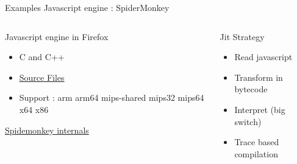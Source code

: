 %
\begin{Frame}{Examples Javascript engine : SpiderMonkey}
  \begin{columns}[t]
    \begin{column}{\BW} %
      \begin{block}{Javascript engine in Firefox}
        \begin{itemize}
        \item C and C++
        \item
          \href{https://hg.mozilla.org/mozilla-central/file/tip/js/src}{Source
            Files}
        \item Support : arm arm64 mips-shared mips32 mips64 x64 x86
        \end{itemize}
      \end{block} 
      \href{https://developer.mozilla.org/en-US/docs/Mozilla/Projects/SpiderMonkey/Internals}{Spidemonkey  internals}
    \end{column}
    
    \begin{column}{\BW} %
      \begin{block}{Jit Strategy}
        \begin{itemize}
        \item Read javascript
        \item Transform in bytecode
        \item Interpret (big switch)
        \item Trace based compilation
        \end{itemize}
      \end{block}   
    \end{column}
  \end{columns}  
\end{Frame}


